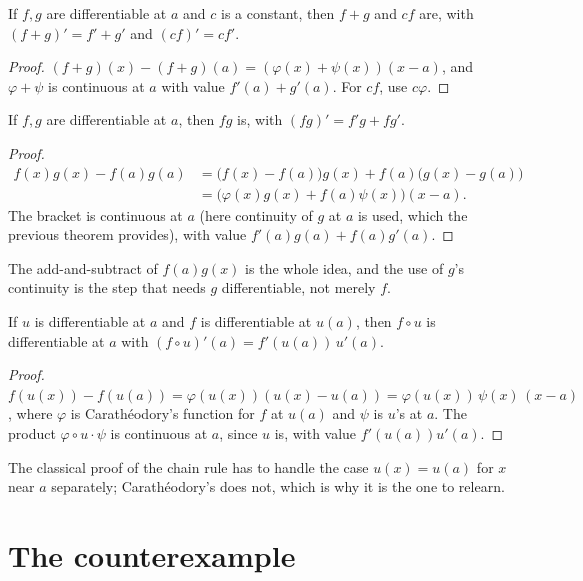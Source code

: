 \begin{theorem}[Linearity]
  If $f, g$ are differentiable at $a$ and $c$ is a constant, then $f + g$ and $cf$ are, with
  $(f+g)' = f' + g'$ and $(cf)' = cf'$.
\end{theorem}
\begin{proof}
  $(f + g)(x) - (f+g)(a) = (\varphi(x) + \psi(x))(x - a)$, and $\varphi + \psi$ is continuous at
  $a$ with value $f'(a) + g'(a)$. For $cf$, use $c\varphi$.
\end{proof}

\begin{theorem}
  If $f, g$ are differentiable at $a$, then $fg$ is, with $(fg)' = f'g + fg'$.
\end{theorem}
\begin{proof}
  \begin{align*}
    f(x)g(x) - f(a)g(a) &= \big(f(x) - f(a)\big) g(x) + f(a)\big(g(x) - g(a)\big) \\
      &= \big(\varphi(x) g(x) + f(a)\psi(x)\big)(x - a).
  \end{align*}
  The bracket is continuous at $a$ (here continuity of $g$ at $a$ is used, which the previous
  theorem provides), with value $f'(a)g(a) + f(a)g'(a)$.
\end{proof}

The add-and-subtract of $f(a)g(x)$ is the whole idea, and the use of $g$'s continuity is the
step that needs $g$ differentiable, not merely $f$.

\begin{theorem}
  If $u$ is differentiable at $a$ and $f$ is differentiable at $u(a)$, then $f \circ u$ is
  differentiable at $a$ with $(f \circ u)'(a) = f'(u(a))\, u'(a)$.
\end{theorem}
\begin{proof}
  $f(u(x)) - f(u(a)) = \varphi(u(x))(u(x) - u(a)) = \varphi(u(x))\, \psi(x)\, (x - a)$, where
  $\varphi$ is Carathéodory's function for $f$ at $u(a)$ and $\psi$ is $u$'s at $a$. The product
  $\varphi \circ u \cdot \psi$ is continuous at $a$, since $u$ is, with value $f'(u(a))u'(a)$.
\end{proof}

The classical proof of the chain rule has to handle the case $u(x) = u(a)$ for $x$ near $a$
separately; Carathéodory's does not, which is why it is the one to relearn.

\section{The counterexample}

